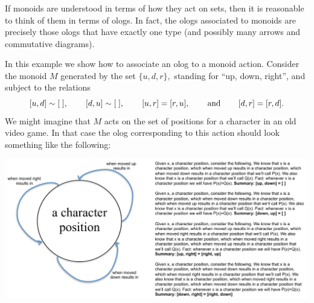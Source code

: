 \documentclass[CT4S-EN-RU]{subfiles}
\begin{document}

\subsubsection{}

\begin{blockENG}
If monoids are understood in terms of how they act on sets, then it is reasonable to think of them in terms of ologs. In fact, the ologs associated to monoids are precisely those ologs that have exactly one type (and possibly many arrows and commutative diagrams).
\end{blockENG}

\begin{blockRUS}
\end{blockRUS}

\begin{exampleENG}\label{ex:monoid as olog}
In this example we show how to associate an olog to a monoid action. Consider the monoid $M$ generated by the set $\{u,d,r\},$ standing for “up, down, right”, and subject to the relations $$[u,d]\sim[\;],\hspace{.3in}[d,u]\sim[\;],\hspace{.3in}[u,r]=[r,u],\hspace{.3in} \textnormal{and}\hspace{.3in} [d,r]=[r,d].$$
We might imagine that $M$ acts on the set of positions for a character in an old video game. In that case the olog corresponding to this action should look something like the following:
\begin{center}
\includegraphics[width=\textwidth]{monoidOlog}
\end{center}
\end{exampleENG}

\begin{exampleRUS}\label{ex:monoid as olog}
\end{exampleRUS}

\end{document}
